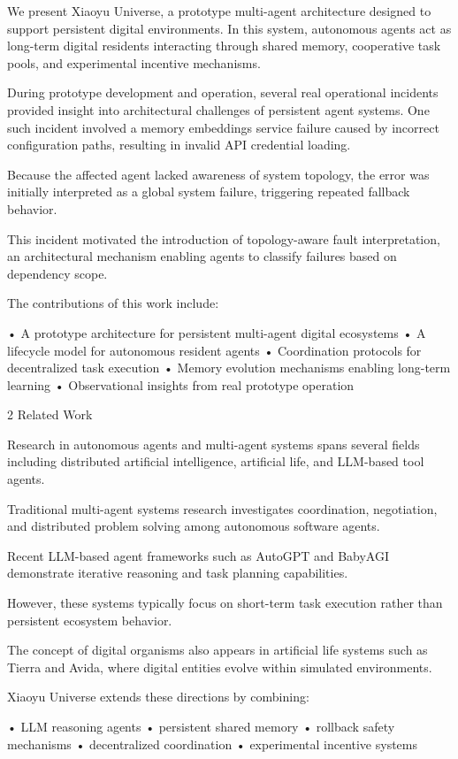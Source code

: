 We present Xiaoyu Universe, a prototype multi-agent architecture designed to support persistent digital environments. In this system, autonomous agents act as long-term digital residents interacting through shared memory, cooperative task pools, and experimental incentive mechanisms.

During prototype development and operation, several real operational incidents provided insight into architectural challenges of persistent agent systems. One such incident involved a memory embeddings service failure caused by incorrect configuration paths, resulting in invalid API credential loading.

Because the affected agent lacked awareness of system topology, the error was initially interpreted as a global system failure, triggering repeated fallback behavior.

This incident motivated the introduction of topology-aware fault interpretation, an architectural mechanism enabling agents to classify failures based on dependency scope.

The contributions of this work include:

• A prototype architecture for persistent multi-agent digital ecosystems
• A lifecycle model for autonomous resident agents
• Coordination protocols for decentralized task execution
• Memory evolution mechanisms enabling long-term learning
• Observational insights from real prototype operation

2 Related Work

Research in autonomous agents and multi-agent systems spans several fields including distributed artificial intelligence, artificial life, and LLM-based tool agents.

Traditional multi-agent systems research investigates coordination, negotiation, and distributed problem solving among autonomous software agents.

Recent LLM-based agent frameworks such as AutoGPT and BabyAGI demonstrate iterative reasoning and task planning capabilities.

However, these systems typically focus on short-term task execution rather than persistent ecosystem behavior.

The concept of digital organisms also appears in artificial life systems such as Tierra and Avida, where digital entities evolve within simulated environments.

Xiaoyu Universe extends these directions by combining:

• LLM reasoning agents
• persistent shared memory
• rollback safety mechanisms
• decentralized coordination
• experimental incentive systems

